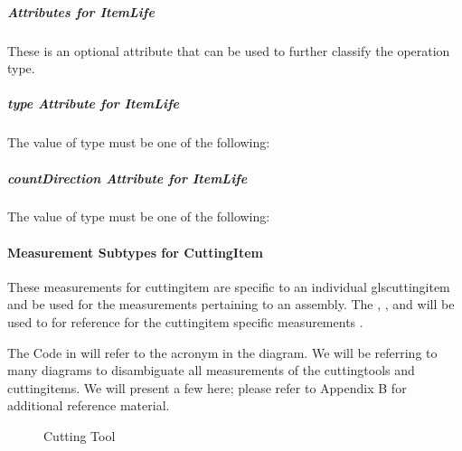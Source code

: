 \subparagraph{Attributes for ItemLife}\mbox{}

These is an optional attribute that can be used to further classify the operation type.



\subparagraph{type Attribute for ItemLife}\mbox{}

The value of type must be one of the following:



\subparagraph{countDirection Attribute for ItemLife}\mbox{}

The value of type must be one of the following:



\paragraph{Measurement Subtypes for CuttingItem}\mbox{}

These \glspl{measurement} for \gls{cuttingitem} are specific to an individual gls{cuttingitem} and \MUSTNOT be used for the  \glspl{measurement} pertaining to an assembly.  The , ,  and  will be used to for reference for the \gls{cuttingitem} specific \glspl{measurement} .

The Code in  will refer to the acronym in the diagram.  We will be referring to many diagrams to disambiguate all  \glspl{measurement} of the \glspl{cuttingtool} and \glspl{cuttingitem}.  We will present a few here; please refer to Appendix B for additional reference material.

\begin{figure}[ht]
  \centering
  \caption{Cutting Tool}
  \label{fig:cutting-tool}
\end{figure}

